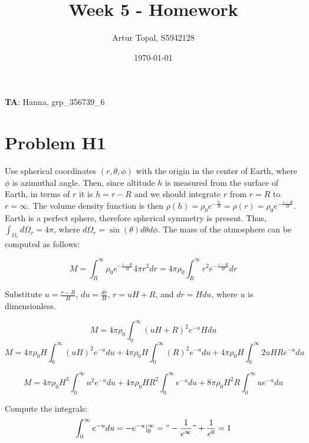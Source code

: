 \documentclass{article}
\title{Week 5 - Homework}
\author{Artur Topal, S5942128}
\date{\today}
\begin{document}
\maketitle

\begin{center}
  \textbf{TA}: Hanna, grp\_356739\_6
\end{center}

\pagebreak

\section{ Problem H1 } 

Use spherical coordinates $(r, \theta, \phi)$ with the origin in the center of Earth, where $\phi$ is azimuthal angle. Then, since altitude $h$ is measured from the surface of Earth, in terms of $r$ it is $h=r-R$ and we should integrate $r$ from $r=R$ to $r=\infty$. The volume density function is then $\rho(h) = \rho_0 e^{-\frac{h}{H}} = \rho(r) = \rho_0 e^{-\frac{r-R}{H}}$. Earth is a perfect sphere, therefore spherical symmetry is present. Thus, $\int_{\Omega_r} d\Omega_r = 4\pi$, where $d\Omega_r = \sin(\theta) d\theta d\phi$. The mass of the atmosphere can be computed as follows:

\begin{equation*}
M = \int_{R}^{\infty} \rho_0 e^{-\frac{r-R}{H}} 4\pi r^2 dr = 4\pi \rho_0 \int_{R}^{\infty} r^2 e^{-\frac{r-R}{H}} dr
\end{equation*}

Substitute $u = \frac{r- R}{H}$, $du = \frac{dr}{H}$, $r = uH + R$, and $dr = Hdu$, where $u$ is dimensionless.

\begin{equation*}
M = 4\pi \rho_0 \int_{0}^{\infty} (uH + R)^2 e^{-u} Hdu
\end{equation*}
\begin{equation*}
M = 4\pi \rho_0H \int_{0}^{\infty} (uH)^2 e^{-u} du + 4\pi \rho_0H \int_{0}^{\infty} (R)^2 e^{-u} du + 4\pi \rho_0H \int_{0}^{\infty} 2uHR e^{-u} du
\end{equation*}

\begin{equation} \label{eq:mass_uneval}
M = 4\pi \rho_0H^3 \int_{0}^{\infty} u^2 e^{-u} du + 4\pi \rho_0HR^2 \int_{0}^{\infty} e^{-u} du + 8\pi \rho_0H^2R \int_{0}^{\infty} u e^{-u} du
\end{equation}

Compute the integrals: 
\begin{equation*}
  \int_0^\infty e^{-u} du = -e^{-u} |_0^\infty = "-\frac{1}{e^\infty}" + \frac{1}{e^0} = 1
\end{equation*}
\end{document}
